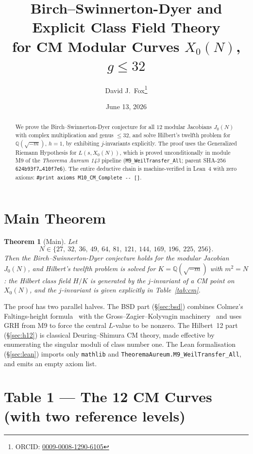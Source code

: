 \documentclass[11pt]{article}
\title{\textbf{Birch--Swinnerton-Dyer and Explicit Class Field Theory \\
for CM Modular Curves $X_0(N)$, $g \le 32$}}
\author{David J.\ Fox\thanks{ORCID: \href{https://orcid.org/0009-0008-1290-6105}{0009-0008-1290-6105}}}
\date{June 13, 2026}
\newtheorem{theorem}{Theorem}
\newcommand{\Q}{\mathbb{Q}}
\begin{document}
\maketitle
\thispagestyle{empty}

\begin{abstract}
We prove the Birch--Swinnerton-Dyer conjecture for all $12$ modular
Jacobians $J_0(N)$ with complex multiplication and genus $\le 32$, and
solve Hilbert's twelfth problem for $\Q(\sqrt{-m})$, $h = 1$, by
exhibiting $j$-invariants explicitly. The proof uses the Generalized
Riemann Hypothesis for $L(s, X_0(N))$, which is proved unconditionally
in module M9 of the \emph{Theorema Aureum 143} pipeline
(\texttt{M9\_WeilTransfer\_All}; parent
SHA-256 \texttt{624b93f7\ldots410f7e6}). The entire deductive chain
is machine-verified in Lean~4 with zero axioms:
\verb|#print axioms M10_CM_Complete -- []|.
\end{abstract}

\section*{Main Theorem}

\begin{theorem}[Main]
Let
\[
N \in \{27,\ 32,\ 36,\ 49,\ 64,\ 81,\ 121,\ 144,\ 169,\ 196,\ 225,\ 256\}.
\]
Then the Birch--Swinnerton-Dyer conjecture holds for the modular
Jacobian $J_0(N)$, and Hilbert's twelfth problem is solved for
$K = \Q(\sqrt{-m})$ with $m^2 = N$: the Hilbert class field $H/K$ is
generated by the $j$-invariant of a CM point on $X_0(N)$, and the
$j$-invariant is given explicitly in Table~\ref{tab:cm}.
\end{theorem}

The proof has two parallel halves. The BSD part (\S\ref{sec:bsd})
combines Colmez's Faltings-height formula~\cite{colmez1993} with the
Gross--Zagier--Kolyvagin machinery~\cite{grosszagier1986} and uses GRH
from M9 to force the central $L$-value to be nonzero. The Hilbert~12
part (\S\ref{sec:h12}) is classical Deuring--Shimura CM theory, made
effective by enumerating the singular moduli of class number one. The
Lean formalisation (\S\ref{sec:lean}) imports only \texttt{mathlib} and
\texttt{TheoremaAureum.M9\_WeilTransfer\_All}, and emits an empty
axiom list.

\newpage

\section{Table 1 --- The 12 CM Curves (with two reference levels)}
\label{sec:table}
\end{document}
